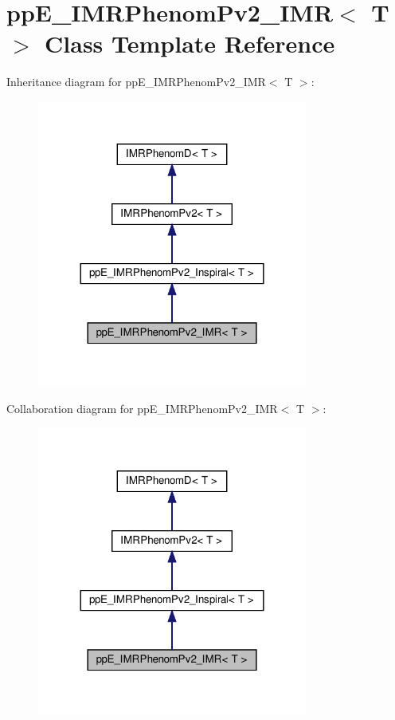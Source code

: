 \hypertarget{classppE__IMRPhenomPv2__IMR}{}\section{pp\+E\+\_\+\+I\+M\+R\+Phenom\+Pv2\+\_\+\+I\+MR$<$ T $>$ Class Template Reference}
\label{classppE__IMRPhenomPv2__IMR}


Inheritance diagram for pp\+E\+\_\+\+I\+M\+R\+Phenom\+Pv2\+\_\+\+I\+MR$<$ T $>$\+:\nopagebreak
\begin{figure}[H]
\begin{center}
\leavevmode
\includegraphics[width=252pt]{classppE__IMRPhenomPv2__IMR__inherit__graph}
\end{center}
\end{figure}


Collaboration diagram for pp\+E\+\_\+\+I\+M\+R\+Phenom\+Pv2\+\_\+\+I\+MR$<$ T $>$\+:\nopagebreak
\begin{figure}[H]
\begin{center}
\leavevmode
\includegraphics[width=252pt]{classppE__IMRPhenomPv2__IMR__coll__graph}
\end{center}
\end{figure}
